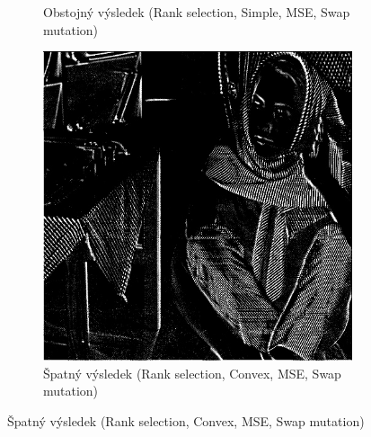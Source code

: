 \documentclass[a4paper,11pt]{scrartcl}
\begin{document}
\begin{figure}[!h]
\begin{subfigure}[b]{0.32\textwidth}
        \caption{Obstojný výsledek (Rank selection, Simple, MSE, Swap mutation)}
        \label{fig:ex62}
    \end{subfigure}
    \begin{subfigure}[b]{0.32\textwidth}
        \includegraphics[width=\textwidth]{img/ranksel-convex-mse-swap_example6.jpg}
        \caption{Špatný výsledek (Rank selection, Convex, MSE, Swap mutation)}
        \label{fig:ex63}
    \end{subfigure}
\end{figure}
\end{document}
